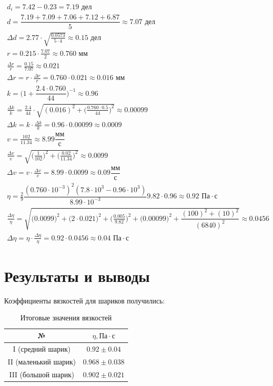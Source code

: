 \documentclass{article}
\begin{document}
\begin{gather*}
    d_{ i} = 7.42 - 0.23 = 7.19 \text{ дел}\\
    d = \dfrac{7.19 + 7.09 + 7.06 + 7.12 + 6.87}{5} \approx 7.07\text{ дел}\\
    \Delta d = 2.77 \cdot \sqrt{\frac{ 0.0573}{ 5\cdot4}} \approx 0.15 \text{ дел}\\
    r = 0.215\cdot \frac{ 7.07}{ 2} \approx 0.760 \text{ мм}\\
    \frac{ \Delta{r}}{ r} = \frac{ 0.15}{ 7.07} \approx 0.021\\
    \Delta{r} = r \cdot \frac{ \Delta{r}}{ r} = 0.760 \cdot 0.021 \approx 0.016 \text{ мм}\\ 
    k=\bigg(1+\dfrac{ 2.4\cdot 0.760}{ 44} \bigg)^{ -1} \approx 0.96 \\
    \frac{ \Delta{k}}{ k} = \frac{ 2.4}{ 44}\cdot\sqrt{(0.016)^2 + \bigg( \frac{ 0.760\cdot0.5}{ 44}\bigg)^2}\approx 0.00099\\
    \Delta{k} = k \cdot \frac{ \Delta{k}}{ k} = 0.96\cdot0.00099 \approx 0.0009\\
    v = \frac{ 102}{ 11.34} \approx 8.99 \dfrac{ \text{мм}}{ \text{с}}\\
    \frac{ \Delta{v}}{ v} = \sqrt{\bigg( \frac{ 1}{ 102} \bigg)^2 + \bigg( \frac{ 0.02}{ 11.34} \bigg)^2} \approx 0.0099\\
    \Delta{v} = v \cdot \frac{ \Delta{v}}{ v} = 8.99 \cdot 0.0099 \approx 0.09 \dfrac{ \text{мм}}{ \text{с}}\\
    \eta = \frac{ 2}{ 9}\dfrac{(0.760\cdot10^{-3})^{ 2}(7.8\cdot10^3-0.96\cdot10^3)}{8.99\cdot10^{-3}}9.82\cdot0.96 \approx 0.92 \text{ Па}\cdot\text{с}\\
    \frac{ \Delta{\eta}}{ \eta} = \sqrt{\bigg(0.0099\bigg)^2 + 
        \bigg( 2\cdot0.021 \bigg)^2 + \bigg( \frac{ 0.005}{ 9.82} \bigg)^2 +
        \bigg( 0.00099 \bigg)^2 + \dfrac{(100)^2 + (10)^2}{(6840)^2}} \approx 0.0456\\
    \Delta{\eta} = \eta \cdot \frac{ \Delta{\eta}}{ \eta} = 0.92\cdot0.0456\approx0.04 \text{ Па}\cdot\text{с} 
\end{gather*}

\section{Результаты и выводы}

Коэффициенты вязкостей для шариков получились:
\begin{table}[H]
   \centering
   \begin{tabular}{|c|c|} \hline
       № & $\eta , \text{Па}\cdot\text{с}$ \\ \hline
       I (средний шарик)&   $0.92 \pm 0.04$ \\ \hline
       II (маленький шарик)&  $0.968 \pm 0.038$ \\ \hline
       III (большой шарик)& $0.902 \pm 0.021$ \\ \hline
   \end{tabular}
   \caption{Итоговые значения вязкостей}
\end{table}
\end{document}

